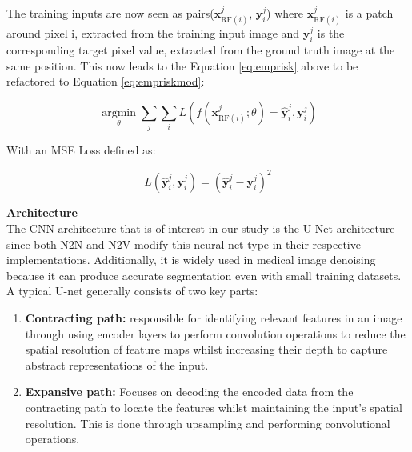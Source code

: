The training inputs are now seen as pairs(${\mathbf{x}}_{{\text{RF}}(i)}^j$, ${\mathbf{y}}_i^j$) where ${\mathbf{x}}_{{\text{RF}}(i)}^j$ is a patch around pixel i, extracted from the training input image and ${\mathbf{y}}_i^j$ is the corresponding target pixel value, extracted from the ground truth image at the same position. This now leads to the Equation \ref{eq:emprisk} above to be refactored to Equation \ref{eq:empriskmod}:

\begin{equation}
	\mathop {\arg \min }\limits_\theta \sum\limits_j \sum\limits_i L\left( f({\mathbf{x}}_{{\text{RF}}(i)}^j;\theta ) = {\mathbf{\hat y}}_i^j, {\mathbf{y}}_i^j \right)
	\label{eq:empriskmod}
\end{equation}


With an \gls{MSE} Loss defined as:

\begin{equation}
	L\left( {\mathbf{\hat y}}_i^j, {\mathbf{y}}_i^j \right) = \left( {\mathbf{\hat y}}_i^j - {\mathbf{y}}_i^j \right)^2
	\label{eq:loss}
\end{equation}

\textbf{Architecture}\\
The \gls{CNN} architecture that is of interest in our study is the \gls{U-Net} architecture since both \gls{N2N} and \gls{N2V} modify this neural net type in their respective implementations. Additionally, it is widely used in medical image denoising because it can produce accurate segmentation even with small training datasets.  A typical U-net generally consists of two key parts:

\begin{enumerate}
	\item \textbf{Contracting path:} responsible for identifying relevant features in an image through using encoder layers to perform convolution operations to reduce the spatial resolution of feature maps whilst increasing their depth to capture abstract representations of the input. 
	\item \textbf{Expansive path:} Focuses on decoding the encoded data from the contracting path to locate the features whilst maintaining the input's spatial resolution. This is done through upsampling and performing convolutional operations.
\end{enumerate}

